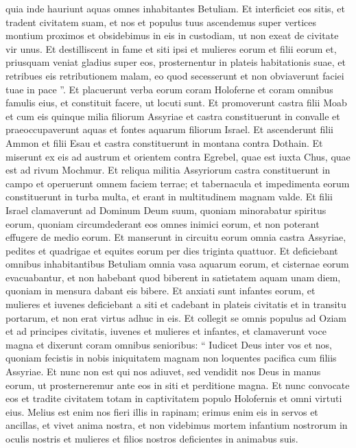\begin{biblechapter}
\begin{biblechapter}
\begin{biblechapter}
\begin{biblechapter}
\begin{biblechapter}
\begin{biblechapter}
\begin{biblechapter}
\verse quia inde hauriunt aquas omnes inhabitantes Betuliam. Et interficiet eos sitis, et tradent civitatem suam, et nos et populus tuus ascendemus super vertices montium proximos et obsidebimus in eis in custodiam, ut non exeat de civitate vir unus. 
\verse Et destilliscent in fame et siti ipsi et mulieres eorum et filii eorum et, priusquam veniat gladius super eos, prosternentur in plateis habitationis suae, 
 \verse et retribues eis retributionem malam, eo quod secesserunt et non obviaverunt faciei tuae in pace ”. 
\verse Et placuerunt verba eorum coram Holoferne et coram omnibus famulis eius, et constituit facere, ut locuti sunt. 
\verse Et promoverunt castra filii Moab et cum eis quinque milia filiorum Assyriae et castra constituerunt in convalle et praeoccupaverunt aquas et fontes aquarum filiorum Israel. 
\verse Et ascenderunt filii Ammon et filii Esau et castra constituerunt in montana contra Dothain. Et miserunt ex eis ad austrum et orientem contra Egrebel, quae est iuxta Chus, quae est ad rivum Mochmur. Et reliqua militia Assyriorum castra constituerunt in campo et operuerunt omnem faciem terrae; et tabernacula et impedimenta eorum constituerunt in turba multa, et erant in multitudinem magnam valde.
 \verse Et filii Israel clamaverunt ad Dominum Deum suum, quoniam minorabatur spiritus eorum, quoniam circumdederant eos omnes inimici eorum, et non poterant effugere de medio eorum. 
\verse Et manserunt in circuitu eorum omnia castra Assyriae, pedites et quadrigae et equites eorum per dies triginta quattuor. Et deficiebant omnibus inhabitantibus Betuliam omnia vasa aquarum eorum, 
\verse et cisternae eorum evacuabantur, et non habebant quod biberent in satietatem aquam unam diem, quoniam in mensura dabant eis bibere. 
\verse Et anxiati sunt infantes eorum, et mulieres et iuvenes deficiebant a siti et cadebant in plateis civitatis et in transitu portarum, et non erat virtus adhuc in eis. 
\verse Et collegit se omnis populus ad Oziam et ad principes civitatis, iuvenes et mulieres et infantes, et clamaverunt voce magna et dixerunt coram omnibus senioribus: 
\verse “ Iudicet Deus inter vos et nos, quoniam fecistis in nobis iniquitatem magnam non loquentes pacifica cum filiis Assyriae. 
\verse Et nunc non est qui nos adiuvet, sed vendidit nos Deus in manus eorum, ut prosterneremur ante eos in siti et perditione magna. 
\verse Et nunc convocate eos et tradite civitatem totam in captivitatem populo Holofernis et omni virtuti eius. 
\verse Melius est enim nos fieri illis in rapinam; erimus enim eis in servos et ancillas, et vivet anima nostra, et non videbimus mortem infantium nostrorum in oculis nostris et mulieres et filios nostros deficientes in animabus suis. 

\end{biblechapter}
\end{biblechapter}
\end{biblechapter}
\end{biblechapter}
\end{biblechapter}
\end{biblechapter}
\end{biblechapter}
